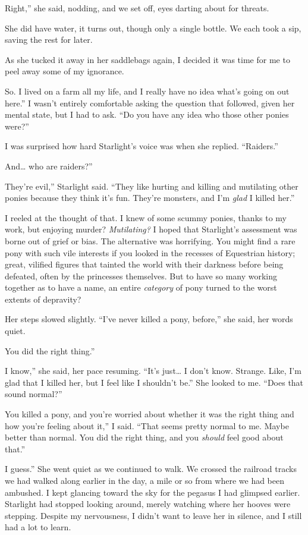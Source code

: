 \leavevmode{}Right,” she said, nodding, and we set off, eyes darting about for threats.

She did have water, it turns out, though only a single bottle. We each took a sip, saving the rest for later.

As she tucked it away in her saddlebags again, I decided it was time for me to peel away some of my ignorance.

\leavevmode{}So. I lived on a farm all my life, and I really have no idea what’s going on out here.” I wasn’t entirely comfortable asking the question that followed, given her mental state, but I had to ask. “Do you have any idea who those other ponies were?”

I was surprised how hard Starlight’s voice was when she replied. “Raiders.”

\leavevmode{}And… who are raiders?”

\leavevmode{}They’re evil,” Starlight said. “They like hurting and killing and mutilating other ponies because they think it’s fun. They’re monsters, and I’m \textit{glad} I killed her.”

I reeled at the thought of that. I knew of some scummy ponies, thanks to my work, but enjoying murder? \textit{Mutilating?} I hoped that Starlight’s assessment was borne out of grief or bias. The alternative was horrifying. You might find a rare pony with such vile interests if you looked in the recesses of Equestrian history; great, vilified figures that tainted the world with their darkness before being defeated, often by the princesses themselves. But to have so many working together as to have a name, an entire \textit{category} of pony turned to the worst extents of depravity?

Her steps slowed slightly. “I’ve never killed a pony, before,” she said, her words quiet.

\leavevmode{}You did the right thing.”

\leavevmode{}I know,” she said, her pace resuming. “It’s just… I don’t know. Strange. Like, I’m glad that I killed her, but I feel like I shouldn’t be.” She looked to me. “Does that sound normal?”

\leavevmode{}You killed a pony, and you’re worried about whether it was the right thing and how you’re feeling about it,” I said. “That seems pretty normal to me. Maybe better than normal. You did the right thing, and you \textit{should} feel good about that.”

\leavevmode{}I guess.” She went quiet as we continued to walk. We crossed the railroad tracks we had walked along earlier in the day, a mile or so from where we had been ambushed. I kept glancing toward the sky for the pegasus I had glimpsed earlier. Starlight had stopped looking around, merely watching where her hooves were stepping. Despite my nervousness, I didn’t want to leave her in silence, and I still had a lot to learn.

